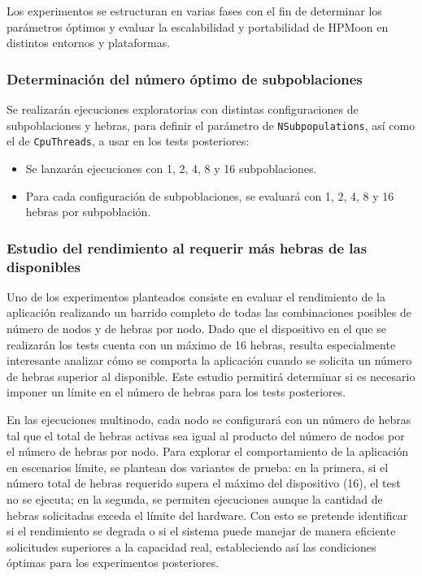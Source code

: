 Los experimentos se estructuran en varias fases con el fin de determinar los parámetros óptimos y evaluar la escalabilidad y portabilidad de HPMoon en distintos entornos y plataformas.

\subsubsection{Determinación del número óptimo de subpoblaciones}\label{subsubsec:determinacion_subpoblaciones}

Se realizarán ejecuciones exploratorias con distintas configuraciones de subpoblaciones y hebras, para definir el parámetro de \texttt{NSubpopulations}, así como el de \texttt{CpuThreads}, a usar en los tests posteriores:

\begin{itemize}
    \item Se lanzarán ejecuciones con 1, 2, 4, 8 y 16 subpoblaciones.
    \item Para cada configuración de subpoblaciones, se evaluará con 1, 2, 4, 8 y 16 hebras por subpoblación.
\end{itemize}

\subsubsection{Estudio del rendimiento al requerir más hebras de las disponibles}

Uno de los experimentos planteados consiste en evaluar el rendimiento de la aplicación realizando un barrido completo de todas las combinaciones posibles de número de nodos y de hebras por nodo. Dado que el dispositivo en el que se realizarán los tests cuenta con un máximo de 16 hebras, resulta especialmente interesante analizar cómo se comporta la aplicación cuando se solicita un número de hebras superior al disponible. Este estudio permitirá determinar si es necesario imponer un límite en el número de hebras para los tests posteriores.

En las ejecuciones multinodo, cada nodo se configurará con un número de hebras tal que el total de hebras activas sea igual al producto del número de nodos por el número de hebras por nodo. Para explorar el comportamiento de la aplicación en escenarios límite, se plantean dos variantes de prueba: en la primera, si el número total de hebras requerido supera el máximo del dispositivo (16), el test no se ejecuta; en la segunda, se permiten ejecuciones aunque la cantidad de hebras solicitadas exceda el límite del hardware. Con esto se pretende identificar si el rendimiento se degrada o si el sistema puede manejar de manera eficiente solicitudes superiores a la capacidad real, estableciendo así las condiciones óptimas para los experimentos posteriores.

